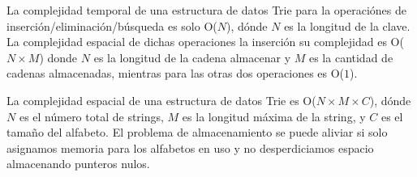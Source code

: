 La complejidad temporal de una estructura de datos Trie para la operaciónes de inserción/eliminación/búsqueda es solo O($N$), dónde $N$ es la longitud de la clave. La complejidad espacial de dichas operaciones la inserción su complejidad es O($N\times M$) donde $N$ es la longitud de la cadena almacenar y $M$ es la cantidad de cadenas almacenadas, mientras para las otras dos operaciones es O($1$).

La complejidad espacial de una estructura de datos Trie es O($N\times M\times C$), dónde $N$ es el número total de strings, $M$ es la longitud máxima de la string, y $C$ es el tamaño del alfabeto. El problema de almacenamiento se puede aliviar si solo asignamos memoria para los alfabetos en uso y no desperdiciamos espacio almacenando punteros nulos.